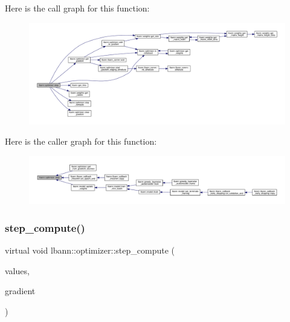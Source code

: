 Here is the call graph for this function\+:\nopagebreak
\begin{figure}[H]
\begin{center}
\leavevmode
\includegraphics[width=350pt]{classlbann_1_1optimizer_aa9f43ca3f22edc0a25d0509b6514a411_cgraph}
\end{center}
\end{figure}
Here is the caller graph for this function\+:\nopagebreak
\begin{figure}[H]
\begin{center}
\leavevmode
\includegraphics[width=350pt]{classlbann_1_1optimizer_aa9f43ca3f22edc0a25d0509b6514a411_icgraph}
\end{center}
\end{figure}
\mbox{\label{classlbann_1_1optimizer_a0db72c298a0bc3405fb0af97d104a036}} 
\subsubsection{\texorpdfstring{step\+\_\+compute()}{step\_compute()}}
{\footnotesize\ttfamily virtual void lbann\+::optimizer\+::step\+\_\+compute (\begin{DoxyParamCaption}\item[{\hyperlink{base_8hpp_a9a697a504ae84010e7439ffec862b470}{Abs\+Dist\+Mat} \&}]{values,  }\item[{const \hyperlink{base_8hpp_a9a697a504ae84010e7439ffec862b470}{Abs\+Dist\+Mat} \&}]{gradient }\end{DoxyParamCaption})\hspace{0.3cm}{\ttfamily [pure virtual]}}

